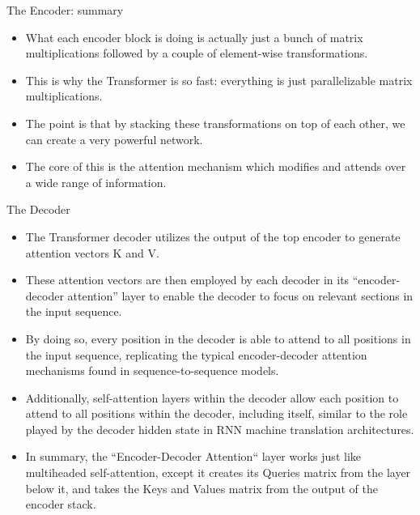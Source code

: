 \documentclass[handout]{beamer}
\begin{document}
\begin{frame}{The Encoder: summary}
\begin{scriptsize}
\begin{itemize}

 \item  What each encoder block is doing is actually just a bunch of matrix multiplications followed by a couple of element-wise transformations.

 \item This is why the Transformer is so fast: everything is just parallelizable matrix multiplications.

 \item The point is that by stacking these transformations on top of each other, we can create a very powerful network.

 \item The core of this is the attention mechanism which modifies and attends over a wide range of information.

\end{itemize}

\end{scriptsize}

\end{frame}



\begin{frame}{The Decoder}
\begin{scriptsize}
\begin{itemize}

\item The Transformer decoder utilizes the output of the top encoder to generate attention vectors K and V. 
\item These attention vectors are then employed by each decoder in its ``encoder-decoder attention'' layer to enable the decoder to focus on relevant sections in the input sequence.

\item By doing so, every position in the decoder is able to attend to all positions in the input sequence, replicating the typical encoder-decoder attention mechanisms found in sequence-to-sequence models. 

\item Additionally, self-attention layers within the decoder allow each position to attend to all positions within the decoder, including itself, similar to the role played by the decoder hidden state in RNN machine translation architectures.

\item In summary, the ``Encoder-Decoder Attention`` layer works just like multiheaded self-attention, except it creates its Queries matrix from the layer below it, and takes the Keys and Values matrix from the output of the encoder stack.


 
\end{itemize}

\end{scriptsize}

\end{frame}
\end{document}
